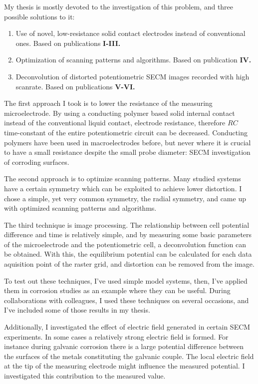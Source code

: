 My thesis is mostly devoted to the investigation of this problem, and three possible solutions to it:

\begin{enumerate}
\item Use of novel, low-resistance solid contact electrodes instead of conventional ones.
Based on publications \textbf{\color{blue}I-III.}
\item Optimization of scanning patterns and algorithms.
Based on publication \textbf{\color{blue}IV.}
\item Deconvolution of distorted potentiometric SECM images recorded with high scanrate.
Based on publications \textbf{\color{blue}V-VI.}
\end{enumerate}

The first approach I took is to lower the resistance of the measuring microelectrode.
By using a conducting polymer based solid internal contact instead of the conventional liquid contact, electrode resistance, therefore $RC$ time-constant of the entire potentiometric circuit can be decreased.
Conducting polymers have been used in macroelectrodes before, but never where it is crucial to have a small resistance despite the small probe diameter: SECM investigation of corroding surfaces.

The second approach is to optimize scanning patterns.
Many studied systems have a certain symmetry which can be exploited to achieve lower distortion.
I chose a simple, yet very common symmetry, the radial symmetry, and came up with optimized scanning patterns and algorithms.

The third technique is image processing.
The relationship between cell potential difference and time is relatively simple, and by measuring some basic parameters of the microelectrode and the potentiometric cell, a deconvolution function can be obtained.
With this, the equilibrium potential can be calculated for each data aquisition point of the raster grid, and distortion can be removed from the image.

To test out these techniques, I've used simple model systems, then, I've applied them in corrosion studies as an example where they can be useful.
During collaborations with colleagues, I used these techniques on several occasions, and I've included some of those results in my thesis.

Additionally, I investigated the effect of electric field generated in certain SECM experiments. In some cases a relatively strong electric field is formed. For instance during galvanic corrosion there is a large potential difference between the surfaces of the metals constituting the galvanic couple. The local electric field at the tip of the measuring electrode might influence the measured potential. I investigated this contribution to the measured value.
